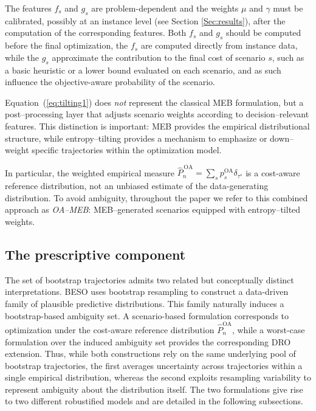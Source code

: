\documentclass[mnsc,sglanonrev]{informs4}  %
\theoremstyle{remark}\newtheorem{remark}{Remark}
\begin{document}
The features $f_s$ and $g_s$ are problem-dependent and the weights $\mu$ and $\gamma$ must be calibrated, possibly at an instance level (see Section \ref{Sec:results}), after the computation of the corresponding features. Both $f_s$ and $g_s$ should be computed before the final optimization, the $f_s$ are computed directly from instance data, while the $g_s$ approximate the contribution to the final cost of scenario $s$, such as a basic heuristic or a lower bound evaluated on each scenario, and as such influence the objective-aware probability of the scenario.

Equation~(\ref{eq:tilting1}) does \emph{not} represent the classical MEB formulation, but a post–processing layer that adjusts scenario weights according to decision–relevant features. This distinction is important: MEB provides the empirical distributional structure, while entropy–tilting provides a mechanism to emphasize or down–weight specific trajectories within the optimization model.

In particular, the weighted empirical measure
$ \widehat{P}^{\,\mathrm{OA}}_n = \sum_s p_s^{\mathrm{OA}}\delta_{\tau^s} $
is a cost-aware reference distribution, not an unbiased estimate of the data-generating distribution.
To avoid ambiguity, throughout the paper we refer to this combined approach as \emph{OA–MEB}: MEB–generated scenarios equipped with entropy–tilted weights.

\subsection{The prescriptive component} \label{Subsec:prescriptive}

The set of bootstrap trajectories admits two related but conceptually distinct interpretations. 
BESO uses bootstrap resampling to construct a data-driven family of plausible predictive distributions. This family naturally induces a bootstrap-based ambiguity set. A scenario-based formulation corresponds to optimization under the cost-aware reference distribution \(\widehat P_n^{\mathrm{OA}}\), while a worst-case formulation over the induced ambiguity set provides the corresponding DRO extension. Thus, while both constructions rely on the same underlying pool of bootstrap trajectories, the first averages uncertainty across trajectories within a single empirical distribution, whereas the second exploits resampling variability to represent ambiguity about the distribution itself. The two formulations give rise to two different robustified models and are detailed in the following subsections.
\end{document}
